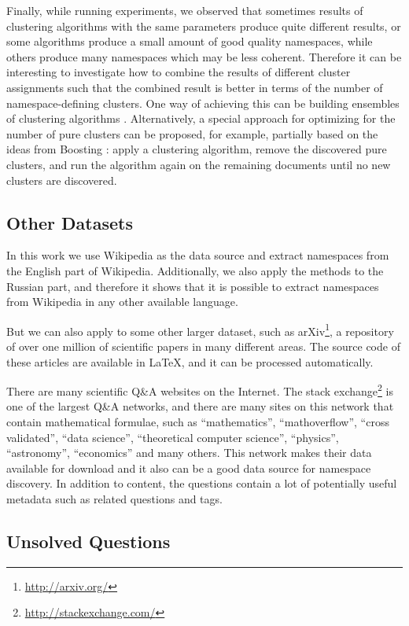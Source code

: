 Finally, while running experiments, we observed that sometimes results of
clustering algorithms with the same parameters produce quite different
results, or some algorithms produce a small amount of good quality namespaces,
while others produce many namespaces which may be less coherent.
Therefore it can be interesting to investigate how to combine the results
of different cluster assignments such that the combined result is better
in terms of the number of namespace-defining clusters. One way of
achieving this can be building ensembles of clustering algorithms \cite{strehl2003cluster}.
Alternatively, a special approach for optimizing for the number of pure clusters
can be proposed, for example, partially based on the ideas from
Boosting \cite{freund1996experiments}: apply a clustering algorithm,
remove the discovered pure clusters, and run the algorithm again on the remaining
documents until no new clusters are discovered.


\subsection{Other Datasets} %

In this work we use Wikipedia as the data source and extract namespaces from the
English part of Wikipedia. Additionally, we also apply the methods to the Russian
part, and therefore it shows that it is possible to extract namespaces from
Wikipedia in any other available language.

But we can also apply to some other larger dataset, such as arXiv\footnote{\url{http://arxiv.org/}}, a repository of over one million
of scientific papers in many different areas. The source code of these
articles are available in \LaTeX, and it can be processed automatically.

There are many scientific Q\&A websites on the Internet. The stack
exchange\footnote{\url{http://stackexchange.com/}} is one of the largest Q\&A networks,
and there are many sites on this network that contain mathematical formulae, such as
``mathematics'', ``mathoverflow'', ``cross validated'', ``data science'',
``theoretical computer science'', ``physics'', ``astronomy'', ``economics'' and many others.
This network makes their data available for download and it also can be a good
data source for namespace discovery. In addition to content, the questions contain
a lot of potentially useful metadata such as related questions and tags.


\subsection{Unsolved Questions} %

